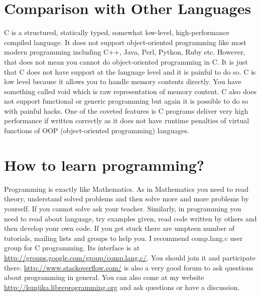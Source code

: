 \section{Comparison with Other Languages}
C is a structured, statically typed, somewhat low-level, high-performance
compiled language. It does not support object-oriented programming like most
modern programming including C++, Java, Perl, Python, Ruby etc. However, that
does not mean you cannot do object-oriented programming in C. It is just that C
does not have support at the language level and it is painful to do so. C is
low level because it allows you to handle memory contents directly. You have
something called void which is raw representation of memory content. C also
does not support functional or generic programming but again it is possible to
do so with painful hacks. One of the coveted features is C programs deliver
very high performance if written correctly as it does not have runtime
penalties of virtual functions of OOP (object-oriented programming) languages.

\section{How to learn programming?}
Programming is exactly like Mathematics. As in Mathematics you need to read
theory, understand solved problems and then solve more and more problems by
yourself. If you cannot solve ask your teacher. Similarly, in programming you
need to read about language, try examples given, read code written by others
and then develop your own code. If you get stuck there are umpteen number of
tutorials, mailing lists and groups to help you. I recommend comp.lang.c user
group for C programming. Its interface is at
\url{http://groups.google.com/group/comp.lang.c/}. You should join it and
participate there. \url{http://www.stackoverflow.com/} is also a very good
forum to ask questions about programming in general. You can also come at my
website 
\url{http://kunjika.libreprogramming.org} and ask questions or have a
discussion. 

